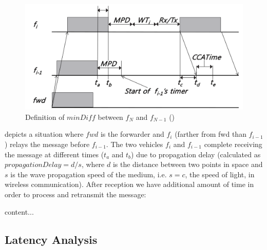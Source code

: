 		\begin{figure}[H]
			\centering
			\includegraphics[width=\textwidth]{immagini/minDiff}
			\caption{Definition of $minDiff$ between $f_N$ and $f_{N-1}$ (\cite{6906275})}
			\label{fig:minDiff}
		\end{figure}
	
		 depicts a situation where $fwd$ is the forwarder and $f_i$ (farther from fwd than $f_{i-1}$) relays the message before $f_{i-1}$. The two vehicles $f_i$ and $f_{i-1}$ complete receiving the message at different times ($t_a$ and $t_b$) due to propagation delay (calculated as $propagationDelay = d / s$, where $d$ is the distance between two points in space and $s$ is the wave propagation speed of the medium, i.e. $s=c$, the speed of light, in wireless communication). After reception we have additional amount of time in order to process and retransmit the message:
		\begin{itemize}
			content...
		\end{itemize}
		
		
		
		
		\subsection{Latency Analysis}
		\label{ssec:latency-analysis}